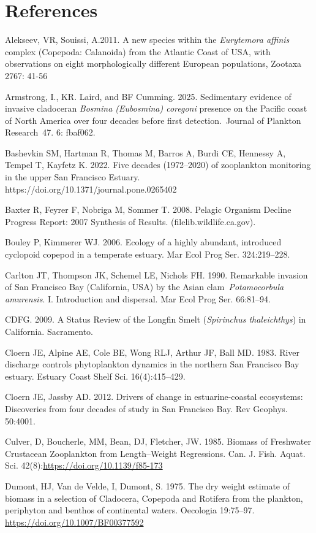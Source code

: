 \documentclass[
  letterpaper,
]{article}
\begin{document}
\section{References}\label{references}

Alekseev, VR, Souissi, A.2011. A new species within the \emph{Eurytemora
affinis} complex (Copepoda: Calanoida) from the Atlantic Coast of USA,
with observations on eight morphologically different European
populations, Zootaxa 2767: 41-56

Armstrong, I., KR. Laird, and BF Cumming. 2025. Sedimentary evidence of
invasive cladoceran \emph{Bosmina (Eubosmina) coregoni} presence on the
Pacific coast of North America over four decades before first
detection.~Journal of Plankton Research~47. 6: fbaf062.

Bashevkin SM, Hartman R, Thomas M, Barros A, Burdi CE, Hennessy A,
Tempel T, Kayfetz K. 2022. Five decades (1972--2020) of zooplankton
monitoring in the upper San Francisco Estuary.
https://doi.org/10.1371/journal.pone.0265402

Baxter R, Feyrer F, Nobriga M, Sommer T. 2008. Pelagic Organism Decline
Progress Report: 2007 Synthesis of Results. (filelib.wildlife.ca.gov).

Bouley P, Kimmerer WJ. 2006. Ecology of a highly abundant, introduced
cyclopoid copepod in a temperate estuary. Mar Ecol Prog Ser.
324:219--228.

Carlton JT, Thompson JK, Schemel LE, Nichols FH. 1990. Remarkable
invasion of San Francisco Bay (California, USA) by the Asian
clam~\emph{Potamocorbula amurensis}. I. Introduction and dispersal. Mar
Ecol Prog Ser. 66:81--94.

CDFG. 2009. A Status Review of the Longfin Smelt (\emph{Spirinchus
thaleichthys}) in California. Sacramento.

Cloern JE, Alpine AE, Cole BE, Wong RLJ, Arthur JF, Ball MD. 1983. River
discharge controls phytoplankton dynamics in the northern San Francisco
Bay estuary. Estuary Coast Shelf Sci. 16(4):415--429.

Cloern JE, Jassby AD. 2012. Drivers of change in estuarine-coastal
ecosystems: Discoveries from four decades of study in San Francisco Bay.
Rev Geophys. 50:4001.

Culver, D, Boucherle, MM, Bean, DJ, Fletcher, JW. 1985. Biomass of
Freshwater Crustacean Zooplankton from Length--Weight Regressions. Can.
J. Fish. Aquat. Sci. 42(8):\url{https://doi.org/10.1139/f85-173}

Dumont, HJ, Van de Velde, I, Dumont, S. 1975. The dry weight estimate of
biomass in a selection of Cladocera, Copepoda and Rotifera from the
plankton, periphyton and benthos of continental waters. Oecologia
19:75--97. \url{https://doi.org/10.1007/BF00377592}
\end{document}
